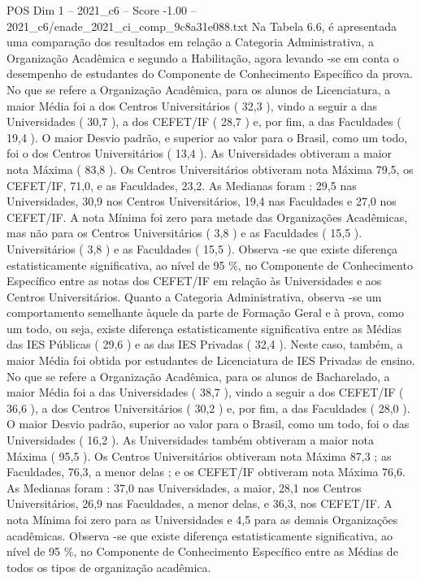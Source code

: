 \begin{textsample}{POS Dim 1 – 2021\_c6 – Score -1.00 – 2021\_c6/enade\_2021\_ci\_comp\_9c8a31e088.txt}
Na Tabela 6.6, é apresentada uma comparação dos resultados em relação a Categoria Administrativa, a Organização Acadêmica e segundo a Habilitação, agora levando -se em conta o desempenho de estudantes do Componente de Conhecimento Específico da prova.
No que se refere a Organização Acadêmica, para os alunos de Licenciatura, a maior Média foi a dos Centros Universitários ( 32,3 ), vindo a seguir a das Universidades ( 30,7 ), a dos CEFET/IF ( 28,7 ) e, por fim, a das Faculdades ( 19,4 ).
O maior Desvio padrão, e superior ao valor para o Brasil, como um todo, foi o dos Centros Universitários ( 13,4 ).
As Universidades obtiveram a maior nota Máxima ( 83,8 ).
Os Centros Universitários obtiveram nota Máxima 79,5, os CEFET/IF, 71,0, e as Faculdades, 23,2.
As Medianas foram : 29,5 nas Universidades, 30,9 nos Centros Universitários, 19,4 nas Faculdades e 27,0 nos CEFET/IF.
A nota Mínima foi zero para metade das Organizações Acadêmicas, mas não para os Centros Universitários ( 3,8 ) e as Faculdades ( 15,5 ).
Universitários ( 3,8 ) e as Faculdades ( 15,5 ).
Observa -se que existe diferença estatisticamente significativa, ao nível de 95 \%, no Componente de Conhecimento Específico entre as notas dos CEFET/IF em relação às Universidades e aos Centros Universitários.
Quanto a Categoria Administrativa, observa -se um comportamento semelhante àquele da parte de Formação Geral e à prova, como um todo, ou seja, existe diferença estatisticamente significativa entre as Médias das IES Públicas ( 29,6 ) e as das IES Privadas ( 32,4 ).
Neste caso, também, a maior Média foi obtida por estudantes de Licenciatura de IES Privadas de ensino.
No que se refere a Organização Acadêmica, para os alunos de Bacharelado, a maior Média foi a das Universidades ( 38,7 ), vindo a seguir a dos CEFET/IF ( 36,6 ), a dos Centros Universitários ( 30,2 ) e, por fim, a das Faculdades ( 28,0 ).
O maior Desvio padrão, superior ao valor para o Brasil, como um todo, foi o das Universidades ( 16,2 ).
As Universidades também obtiveram a maior nota Máxima ( 95,5 ).
Os Centros Universitários obtiveram nota Máxima 87,3 ; as Faculdades, 76,3, a menor delas ; e os CEFET/IF obtiveram nota Máxima 76,6.
As Medianas foram : 37,0 nas Universidades, a maior, 28,1 nos Centros Universitários, 26,9 nas Faculdades, a menor delas, e 36,3, nos CEFET/IF.
A nota Mínima foi zero para as Universidades e 4,5 para as demais Organizações acadêmicas.
Observa -se que existe diferença estatisticamente significativa, ao nível de 95 \%, no Componente de Conhecimento Específico entre as Médias de todos os tipos de organização acadêmica.

\end{textsample}
